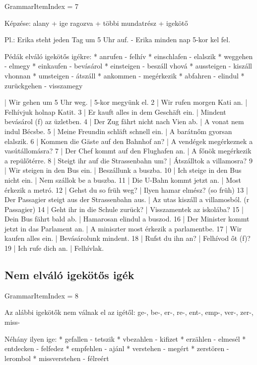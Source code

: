 \documentclass{article}
\newenvironment{desc}{\verbatim}{\endverbatim}
\newenvironment{exmp}{\verbatim}{\endverbatim}
\begin{document}
GrammarItemIndex = 7

\begin{desc}
Képzése: alany + ige ragozva + többi mundatrész + igekötő

Pl.: Erika steht jeden Tag um 5 Uhr auf. - Erika minden nap 5-kor kel fel.

Pédák elváló igekötős igékre:
* anrufen - felhív
* einschlafen - elalszik
* weggehen - elmegy
* einkaufen - bevásárol
* einsteigen - beszáll vhová
* aussteigen - kiszáll vhonnan
* umsteigen - átszáll
* ankommen - megérkezik
* abfahren - elindul
* zurückgehen - visszamegy
\end{desc}

\begin{exmp}
1 | Wir gehen um 5 Uhr weg. | 5-kor megyünk el.
2 | Wir rufen morgen Kati an. | Felhívjuk holnap Katit.
3 | Er kauft alles in dem Geschäft ein. | Mindent bevásárol (f) az üzletben.
4 | Der Zug fährt nicht nach Vien ab. | A vonat nem indul Bécsbe.
5 | Meine Freundin schläft schnell ein. | A barátnőm gyorsan elalszik.
6 | Kommen die Gäste auf den Bahnhof an? | A vendégek megérkeznek a vasútállomásra?
7 | Der Chef kommt auf den Flughafen an. | A főnök megérkezik a repülőtérre.
8 | Steigt ihr auf die Strassenbahn um? | Átszálltok a villamosra?
9 | Wir steigen in den Bus ein. | Beszállunk a buszba.
10 | Ich steige in den Bus nicht ein. | Nem szállok be a buszba.
11 | Die U-Bahn kommt jetzt an. | Most érkezik a metró.
12 | Gehst du so früh weg? | Ilyen hamar elmész? (so früh)
13 | Der Passagier steigt aus der Strassenbahn aus. | Az utas kiszáll a villamosból. (r Passagier)
14 | Geht ihr in die Schule zurück? | Visszamentek az iskolába?
15 | Dein Bus fährt bald ab. | Hamarosan elindul a buszod.
16 | Der Minister kommt jetzt in das Parlament an. | A miniszter most érkezik a parlamentbe.
17 | Wir kaufen alles ein. | Bevásárolunk mindent.
18 | Rufst du ihn an? | Felhívod őt (f)?
19 | Ich rufe dich an. | Felhívlak.
\end{exmp}

\subsection{Nem elváló igekötős igék}

GrammarItemIndex = 8

\begin{desc}
Az alábbi igekötők nem válnak el az igétől:
ge-, be-, er-, re-, ent-, emp-, ver-, zer-, miss-

Néhány ilyen ige:
* gefallen - tetszik
* vbezahlen - kifizet
* erzählen - elmesél
* entdecken - felfedez
* empfehlen - ajánl
* verstehen - megért
* zerstören - lerombol
* missverstehen - félreért
\end{desc}
\end{document}
